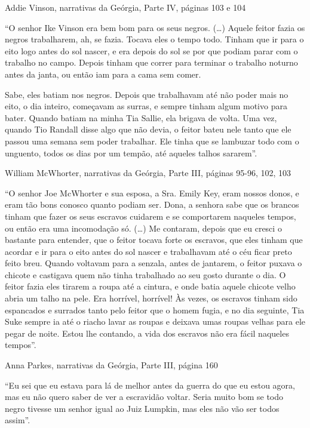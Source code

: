Addie Vinson, narrativas da Geórgia, Parte IV, páginas 103 e 104

``O senhor Ike Vinson era bem bom para os seus negros. (\ldots{}) Aquele
feitor fazia os negros trabalharem, ah, se fazia. Tocava eles o tempo
todo. Tinham que ir para o eito logo antes do sol nascer, e era depois
do sol se por que podiam parar com o trabalho no campo. Depois tinham
que correr para terminar o trabalho noturno antes da janta, ou então iam
para a cama sem comer.

Sabe, eles batiam nos negros. Depois que trabalhavam até não poder mais
no eito, o dia inteiro, começavam as surras, e sempre tinham algum
motivo para bater. Quando batiam na minha Tia Sallie, ela brigava de
volta. Uma vez, quando Tio Randall disse algo que não devia, o feitor
bateu nele tanto que ele passou uma semana sem poder trabalhar. Ele
tinha que se lambuzar todo com o unguento, todos os dias por um tempão,
até aqueles talhos sararem''.

William McWhorter, narrativas da Geórgia, Parte III, páginas 95-96, 102,
103

``O senhor Joe McWhorter e sua esposa, a Sra. Emily Key, eram nossos
donos, e eram tão bons conosco quanto podiam ser. Dona, a senhora sabe
que os brancos tinham que fazer os seus escravos cuidarem e se
comportarem naqueles tempos, ou então era uma incomodação só. (\ldots{})
Me contaram, depois que eu cresci o bastante para entender, que o feitor
tocava forte os escravos, que eles tinham que acordar e ir para o eito
antes do sol nascer e trabalhavam até o céu ficar preto feito breu.
Quando voltavam para a senzala, antes de jantarem, o feitor puxava o
chicote e castigava quem não tinha trabalhado ao seu gosto durante o
dia. O feitor fazia eles tirarem a roupa até a cintura, e onde batia
aquele chicote velho abria um talho na pele. Era horrível, horrível! Às
vezes, os escravos tinham sido espancados e surrados tanto pelo feitor
que o homem fugia, e no dia seguinte, Tia Suke sempre ia até o riacho
lavar as roupas e deixava umas roupas velhas para ele pegar de noite.
Estou lhe contando, a vida dos escravos não era fácil naqueles tempos''.

Anna Parkes, narrativas da Geórgia, Parte III, página 160

``Eu sei que eu estava para lá de melhor antes da guerra do que eu estou
agora, mas eu não quero saber de ver a escravidão voltar. Seria muito
bom se todo negro tivesse um senhor igual ao Juiz Lumpkin, mas eles não
vão ser todos assim''.

